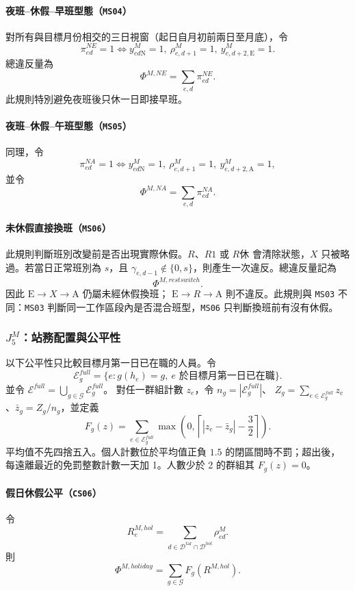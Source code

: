 \documentclass[a4paper,12pt]{article}
\begin{document}
\paragraph{夜班--休假--早班型態（\texttt{MS04}）}
對所有與目標月份相交的三日視窗（起日自月初前兩日至月底），令
\[
  \pi^{NE}_{ed}=1
  \Longleftrightarrow
  y^{M}_{ed\mathrm{N}}=1,
  \ \rho^{M}_{e,d+1}=1,
  \ y^{M}_{e,d+2,\mathrm{E}}=1.
\]
總違反量為
\[
  \Phi^{M,NE}=\sum_{e,d}\pi^{NE}_{ed}.
\]
此規則特別避免夜班後只休一日即接早班。

\paragraph{夜班--休假--午班型態（\texttt{MS05}）}
同理，令
\[
  \pi^{NA}_{ed}=1
  \Longleftrightarrow
  y^{M}_{ed\mathrm{N}}=1,
  \ \rho^{M}_{e,d+1}=1,
  \ y^{M}_{e,d+2,\mathrm{A}}=1,
\]
並令
\[
  \Phi^{M,NA}=\sum_{e,d}\pi^{NA}_{ed}.
\]

\paragraph{未休假直接換班（\texttt{MS06}）}
此規則判斷班別改變前是否出現實際休假。\(R\)、\(R1\) 或 \(R休\) 會清除狀態，\(X\)
只被略過。若當日正常班別為 \(s\)，且
\(\gamma_{e,d-1}\notin\{0,s\}\)，則產生一次違反。總違反量記為
\[
  \Phi^{M,restswitch}.
\]
因此 \(\mathrm{E}\rightarrow X\rightarrow\mathrm{A}\) 仍屬未經休假換班；
\(\mathrm{E}\rightarrow R\rightarrow\mathrm{A}\) 則不違反。此規則與
\texttt{MS03} 不同：\texttt{MS03} 判斷同一工作區段內是否混合班型，\texttt{MS06}
只判斷換班前有沒有休假。

\subsubsection{\texorpdfstring{$J^M_5$}{J5}：站務配置與公平性}

以下公平性只比較目標月第一日已在職的人員。令
\[
  \mathcal E^{full}_g=\{e:g(h_e)=g,\ e\text{ 於目標月第一日已在職}\}.
\]
並令 \(\mathcal E^{full}=\bigcup_{g\in\mathcal G}\mathcal E^{full}_g\)。
對任一群組計數 $z_e$，令 $n_g=|\mathcal E^{full}_g|$、
$Z_g=\sum_{e\in\mathcal E^{full}_g}z_e$、$\bar z_g=Z_g/n_g$，並定義
\[
  F_g(z)
  =
  \sum_{e\in\mathcal E^{full}_g}
  \max\left(0,\left\lceil |z_e-\bar z_g|-\frac{3}{2}\right\rceil\right).
\]
平均值不先四捨五入。個人計數位於平均值正負 $1.5$ 的閉區間時不罰；超出後，
每遠離最近的免罰整數計數一天加 1。人數少於 2 的群組其 $F_g(z)=0$。

\paragraph{假日休假公平（\texttt{CS06}）}
令
\[
  R^{M,hol}_{e}
  =
  \sum_{d\in\mathcal{D}^{\mathrm{tar}}\cap\mathcal{D}^{hol}}
  \rho^{M}_{ed}.
\]
則
\[
  \Phi^{M,holiday}
  =
  \sum_{g\in\mathcal{G}}F_g(R^{M,hol}).
\]
\end{document}
